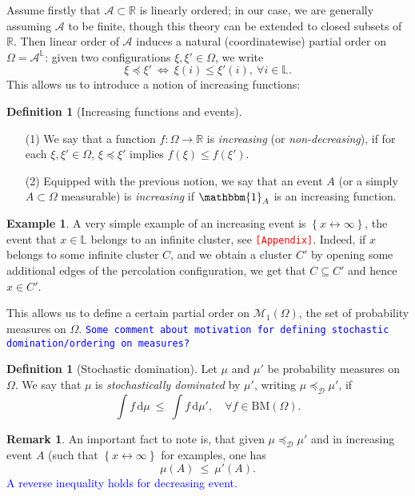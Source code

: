 \documentclass[12pt]{article}
\newcommand{\A}{\mathcal{A}}
\newcommand{\D}{\mathcal{D}}
\renewcommand{\d}{\mathrm{d}}
\renewcommand{\L}{\mathbb{L}}
\newcommand{\M}{\mathcal{M}}
\newcommand{\R}{\mathbb{R}}
\newcommand{\BM}{\mathrm{BM}}
\newcommand{\set}[1]{\left\{#1\right\}}
\newcommand{\ra}{\rightarrow}
\newcommand{\1}{\mathbbm{1}}
\newcommand{\5}{\vspace{0.5cm}}
\theoremstyle{definition}
\newtheorem{ex}[thm]{Example}
\newtheorem{df}[thm]{Definition}
\newtheorem{rem}[thm]{Remark}
\begin{document}
Assume firstly that $\A\subset\R$ is linearly ordered; in our case, we are generally assuming $\A$ to be finite, though this theory can be extended to closed subsets of $\R$. Then linear order of $\A$ induces a natural (coordinatewise) partial order on $\Omega=\A^\L$: given two configurations $\xi,\xi'\in\Omega$, we write
$$\xi\preceq\xi' ~\iff~ \xi(i)\leq\xi'(i),~\forall i\in\L.$$
This allows us to introduce a notion of increasing functions:

\begin{df}[Increasing functions and events]
~
\begin{itemize}
	\item[(1)] We say that a function $f:\Omega\ra\R$ is \textit{increasing} (or \textit{non-decreasing}), if for each $\xi,\xi'\in\Omega$, $\xi\preceq\xi'$ implies $f(\xi)\leq f(\xi')$. 
	\item[(2)] Equipped with the previous notion, we say that an event $A$ (or a simply $A\subset\Omega$ measurable) is \textit{increasing} if $\1_A$ is an increasing function.
\end{itemize}
\end{df}

\begin{ex}
A very simple example of an increasing event is $\set{x\leftrightarrow\infty}$, the event that $x\in\L$ belongs to an infinite cluster, see \textcolor{red}{\texttt{[Appendix]}}. Indeed, if $x$ belongs to some infinite cluster $C$, and we obtain a cluster $C'$ by opening some additional edges of the percolation configuration, we get that $C\subseteq C'$ and hence $x\in C'$.
\end{ex}

 This allows us to define a certain partial order on $\M_1(\Omega)$, the set of probability measures on $\Omega$. \textcolor{blue}{\texttt{Some comment about motivation for defining stochastic domination/ordering on measures?}}
 
\begin{df}[Stochastic domination]
Let $\mu$ and $\mu'$ be probability measures on $\Omega$. We say that $\mu$ is \textit{stochastically dominated} by $\mu'$, writing $\mu\preceq_\D\mu'$, if
$$\int f\,\d\mu ~\leq~ \int f\,\d\mu', \quad \forall f\in\BM(\Omega).$$
\end{df}

\begin{rem}
An important fact to note is, that given $\mu\preceq_\D\mu'$ and in increasing event $A$ (such that $\set{x\leftrightarrow\infty}$ for examples, one has 
$$\mu(A) ~\leq~ \mu'(A).$$
\textcolor{blue}{A reverse inequality holds for decreasing event.}
\end{rem}
\end{document}
